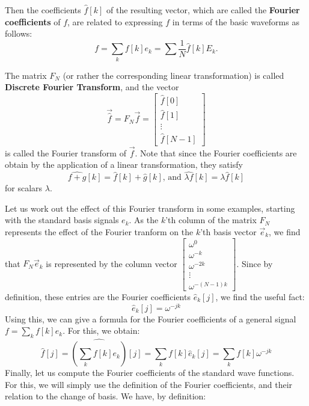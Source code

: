 \documentclass[12pt]{report}
\theoremstyle{plain}
\begin{document}
Then the coefficients $\hat f[k]$ of the resulting vector, which are called the \textbf{Fourier coefficients} of $f$, are related to expressing $f$ in terms of the basic waveforms as follows:
\[f = \sum_k f[k] e_k = \sum \frac 1 N \hat f[k] E_k. \]

The matrix $F_N$ (or rather the corresponding linear transformation) is called \textbf{Discrete Fourier Transform}, and the vector
\[\vec{\hat f} = F_N \vec f = 
\left[
\begin{matrix}
	\hat f[0] \\
	\hat f[1] \\
	\vdots \\
	\hat f[N-1]
\end{matrix}
\right]
\]
is called the Fourier transform of $\vec f$. Note that since the Fourier coefficients are obtain by the application of a linear transformation, they satisfy
\[\widehat{f + g}[k] = \hat f[k] + \hat g[k] \text{, and }\widehat{\lambda f}[k] = \lambda \hat f[k]\]
for scalars $\lambda$.

\medskip
Let us work out the effect of this Fourier transform in some examples, starting with the standard basis signals $e_k$.
As the $k$'th column of the matrix $F_N$ represents the effect of the Fourier tranform on the $k$'th basis vector $\vec e_k$, we find that $F_N \vec e_k$ is represented by the column vector $\begin{bmatrix} \omega^{0} \\ \omega^{-k} \\ \omega^{-2k} \\ \vdots \\ \omega^{-(N-1)k} \end{bmatrix}$. Since by definition, these entries are the Fourier coefficients $\hat e_k[j]$, we find the useful fact:
\begin{equation} \label{fourier coeffs of std}
\hat e_k[j] = \omega^{-jk}	
\end{equation}
Using this, we can give a formula for the Fourier coefficients of a general signal $f = \sum_k f[k] e_k$. For this, we obtain:
\begin{equation} \label{fourier coeffs formula}
\hat f[j] = \widehat{\left(\sum_k f[k] e_k\right)}[j] = \sum_k f[k] \hat e_k[j] = \sum_k f[k] \omega^{-jk}	
\end{equation}
Finally, let us compute the Fourier coefficients of the standard wave functions. For this, we will simply use the definition of the Fourier coefficients, and their relation to the change of basis. We have, by definition:
\begin{align*}
	
\end{align*}
\end{document}
